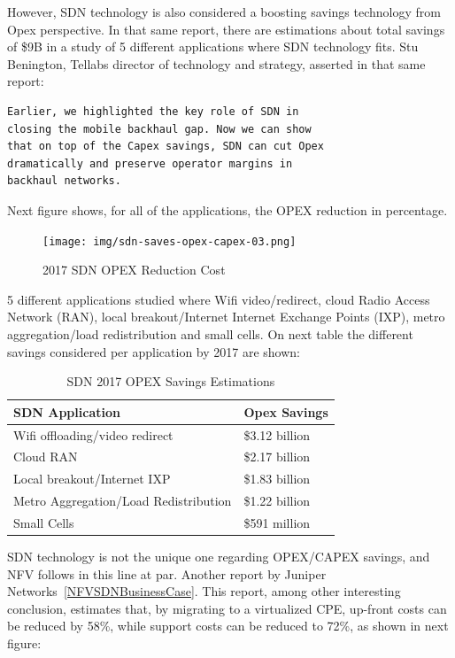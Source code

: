 \documentclass[a4paper, 12pt]{book}
\begin{document}
However, SDN technology is also considered a boosting savings technology from Opex perspective. In that same report, there are estimations about total savings of \$9B in a study of 5 different applications where SDN technology fits. Stu Benington, Tellabs director of technology and strategy, asserted in that same report:
\begin{verbatim}
Earlier, we highlighted the key role of SDN in
closing the mobile backhaul gap. Now we can show
that on top of the Capex savings, SDN can cut Opex
dramatically and preserve operator margins in
backhaul networks.
\end{verbatim}
Next figure shows, for all of the applications, the OPEX reduction in percentage.
\begin{center}
 \begin{figure}[H]
 \begin{center}
   \texttt{[image: img/sdn-saves-opex-capex-03.png]}
   \caption{2017 SDN OPEX Reduction Cost}
   \label{fig:sdnopexreduction}
 \end{center}
 \end{figure}
\end{center}
5 different applications studied where Wifi video/redirect, cloud Radio Access Network (RAN), local breakout/Internet Internet Exchange Points (IXP), metro aggregation/load redistribution and small cells. On next table the different savings considered per application by 2017 are shown:
\begin{table}[H]
\footnotesize
\begin{center}
\begin{tabular}{|l|l|}
\hline
\textbf{SDN Application} & \textbf{Opex Savings} \\ \hline
Wifi offloading/video redirect & \$3.12 billion \\ \hline
Cloud RAN & \$2.17 billion \\ \hline
Local breakout/Internet IXP &	\$1.83 billion  \\ \hline
Metro Aggregation/Load Redistribution & \$1.22 billion  \\ \hline
Small Cells & \$591 million  \\ \hline
\end{tabular}
\end{center}
\caption{SDN 2017 OPEX Savings Estimations}
\label{tab:2017sdnopexsavings}
\end{table}
SDN technology is not the unique one regarding OPEX/CAPEX savings, and NFV follows in this line at par. Another report by Juniper Networks~\ref{NFVSDNBusinessCase}. This report, among other interesting conclusion, estimates that, by migrating to a virtualized CPE, up-front costs can be reduced by 58\%, while support costs can be reduced to 72\%, as shown in next figure:
\end{document}
